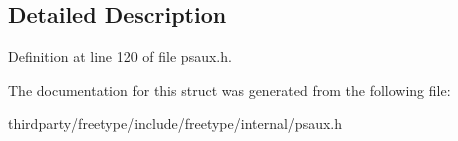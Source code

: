 \subsection{Detailed Description}


Definition at line 120 of file psaux.\+h.



The documentation for this struct was generated from the following file\+:\begin{DoxyCompactItemize}
\item 
thirdparty/freetype/include/freetype/internal/psaux.\+h\end{DoxyCompactItemize}
